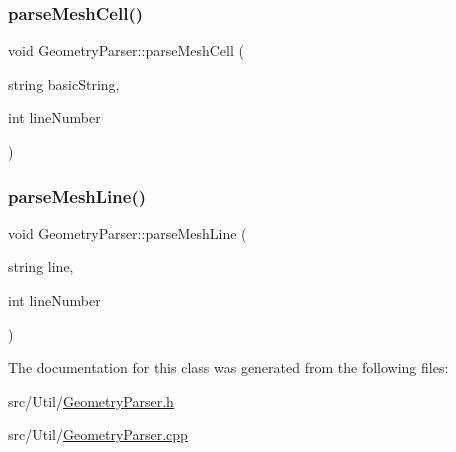 \mbox{\label{classGeometryParser_a599d22091fded7248c6d0bfd8a70caf0}} 
\subsubsection{\texorpdfstring{parseMeshCell()}{parseMeshCell()}}
{\footnotesize\ttfamily void Geometry\+Parser\+::parse\+Mesh\+Cell (\begin{DoxyParamCaption}\item[{string}]{basic\+String,  }\item[{int}]{line\+Number }\end{DoxyParamCaption})}

\mbox{\label{classGeometryParser_a2245b52d12835aafad6b3bd67914215b}} 
\subsubsection{\texorpdfstring{parseMeshLine()}{parseMeshLine()}}
{\footnotesize\ttfamily void Geometry\+Parser\+::parse\+Mesh\+Line (\begin{DoxyParamCaption}\item[{string}]{line,  }\item[{int}]{line\+Number }\end{DoxyParamCaption})}



The documentation for this class was generated from the following files\+:\begin{DoxyCompactItemize}
\item 
src/\+Util/\mbox{\hyperlink{GeometryParser_8h}{Geometry\+Parser.\+h}}\item 
src/\+Util/\mbox{\hyperlink{GeometryParser_8cpp}{Geometry\+Parser.\+cpp}}\end{DoxyCompactItemize}
